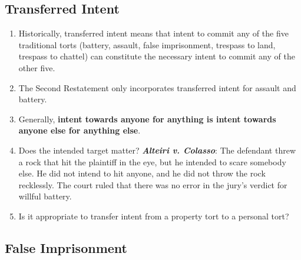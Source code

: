 \subsection{Transferred Intent}

\begin{enumerate}
    \item Historically, transferred intent means that intent to commit any of the five traditional torts (battery, assault, false imprisonment, trespass to land, trespass to chattel) can constitute the necessary intent to commit any of the other five. 
    \item The Second Restatement only incorporates transferred intent for assault and battery.
    \item Generally, \textbf{intent towards anyone for anything is intent towards anyone else for anything else}.
    \item Does the intended target matter? \textbf{\emph{Alteiri v. Colasso}}:  The defendant threw a rock that hit the plaintiff in the eye, but he intended to scare somebody else. He did not intend to hit anyone, and he did not throw the rock recklessly. The court ruled that there was no error in the jury's verdict for willful battery.
    \item Is it appropriate to transfer intent from a property tort to a personal tort?
\end{enumerate}

\subsection{False Imprisonment}

